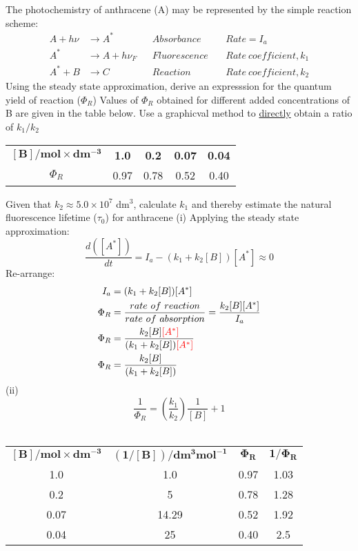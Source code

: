 \documentclass[a4paper,12pt,titlepage]{article}
\begin{document}
\begin{ExerciseList}
\Exercise The photochemistry of anthracene (A) may be represented by the simple reaction scheme:
\begin{align*}
A + h\nu &\rightarrow A^*	&	&Absorbance\	& &Rate = I_a\\
A^* &\rightarrow A + h\nu_F 	&	&Fluorescence\	&		&Rate\ coefficient, k_1\\
A^* + B &\rightarrow C &	 &Reaction\	&	&Rate\ coefficient, k_2
\end{align*}
\Question Using the steady state approximation, derive an expresssion for the quantum yield of reaction (\(\Phi_R\))
\Question Values of \(\Phi_R\) obtained for different added concentrations of B are given in the table below. Use a graphicval method to \underline{directly} obtain a ratio of \(k_1/k_2\)
\begin{tabular}{ccccc}
\(\mathbf{[B]/mol\times dm^{-3}}\) & \textbf{1.0} & \textbf{0.2} & \textbf{0.07} & \textbf{0.04}\\
\(\Phi_R\) & 0.97 & 0.78 & 0.52 & 0.40
\end{tabular}

\Question Given that \(k_2 \approx 5.0\times10^7\) dm\(^3\), calculate \(k_1\) and thereby estimate the natural fluorescence lifetime (\(\tau_0\)) for anthracene
\Answer 
(i) Applying the steady state approximation:\\
\[\frac{d([A^*])}{dt} = I_a - (k_1 + k_2[B])[A^*] \approx 0\]
Re-arrange:
\begin{align*}
I_a &= (k_1 + k_2[B])[A^*]\\
\Phi_R &= \frac{rate\ of\ reaction}{rate\ of\ absorption} = \frac{k_2[B][A^*]}{I_a}\\
\Phi_R &= \frac{k_2[B]\textcolor{red}{[A^*]}}{(k_1 + k_2[B])\textcolor{red}{[A^*]}}\\
\Phi_R &= \frac{k_2[B]}{(k_1 + k_2[B])}
\end{align*}
(ii) \[ \frac{1}{\Phi_R} = \left(\frac{k_1}{k_2}\right)\frac{1}{[B]} + 1\]\\
\begin{tabular}{cccc}
\(\mathbf{[B]/mol\times dm^{-3}}\) & \(\mathbf{(1/[B])/dm^3mol^{-1}}\) & \(\mathbf{\Phi_R}\) & \(\mathbf{1/\Phi_R}\)\\
1.0 & 1.0 & 0.97 & 1.03\\
0.2 & 5 & 0.78 & 1.28\\
0.07 & 14.29 & 0.52 & 1.92\\
0.04 & 25 & 0.40 & 2.5\\
\end{tabular}


\end{ExerciseList}
\end{document}
